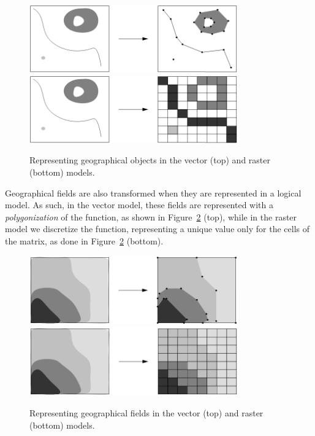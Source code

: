     \begin{figure}[ht]
		\begin{center}
			{\includegraphics[width=0.8\textwidth]{figures/obj_vector.png}}
			{\includegraphics[width=0.8\textwidth]{figures/obj_raster.png}}
		\end{center}
		\caption{Representing geographical objects in the vector (top) and raster (bottom) models.}
		\label{fig:gis:object}
	\end{figure}
	
	Geographical fields are also transformed when they are represented in a logical model. As such, in the vector model, these fields are represented with a \textit{polygonization} of the function, as shown in Figure~\ref{fig:gis:field} (top), while in the raster model we discretize the function, representing a unique value only for the cells of the matrix, as done in Figure~\ref{fig:gis:field} (bottom).
    
    \begin{figure}[ht]
		\begin{center}
			{\includegraphics[width=0.8\textwidth]{figures/field_vector.png}}
			{\includegraphics[width=0.8\textwidth]{figures/field_raster.png}}
		\end{center}
		\caption{Representing geographical fields in the vector (top) and raster (bottom) models.}
		\label{fig:gis:field}
	\end{figure}
    
